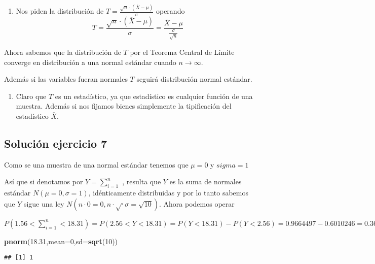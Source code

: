 \documentclass[]{article}
\newenvironment{Shaded}{\begin{snugshade}}{\end{snugshade}}
\newcommand{\DataTypeTok}[1]{\textcolor[rgb]{0.13,0.29,0.53}{#1}}
\newcommand{\DecValTok}[1]{\textcolor[rgb]{0.00,0.00,0.81}{#1}}
\newcommand{\FloatTok}[1]{\textcolor[rgb]{0.00,0.00,0.81}{#1}}
\newcommand{\KeywordTok}[1]{\textcolor[rgb]{0.13,0.29,0.53}{\textbf{#1}}}
\newcommand{\NormalTok}[1]{#1}
\providecommand{\tightlist}{%
  \setlength{\itemsep}{0pt}\setlength{\parskip}{0pt}}
\begin{document}
\begin{enumerate}
\def\labelenumi{\alph{enumi}.}
\tightlist
\item
  Nos piden la distribución de
  \(T=\frac{\sqrt{n}\cdot (\overline{X}-\mu)}{\sigma}\) operando
  \[T=\frac{\sqrt{n}\cdot(\overline{X}-\mu)}{\sigma}=
  \frac{\overline{X}-\mu}{\frac{\sigma}{\sqrt{n}}}\]
\end{enumerate}

Ahora sabemos que la distribución de \(T\) por el Teorema Central de
Límite converge en distribución a una normal estándar cuando
\(n\to\infty\).

Además si las variables fueran normales \(T\) seguirá distribución
normal estándar.

\begin{enumerate}
\def\labelenumi{\alph{enumi}.}
\setcounter{enumi}{1}
\tightlist
\item
  Claro que \(T\) es un estadístico, ya que estadístico es cualquier
  función de una muestra. Además si nos fijamos bienes simplemente la
  tipificación del estadístico \(\overline{X}\).
\end{enumerate}

\hypertarget{soluciuxf3n-ejercicio-7}{%
\subsection{Solución ejercicio 7}\label{soluciuxf3n-ejercicio-7}}

Como se una muestra de una normal estándar tenemos que \(\mu=0\) y
\(sigma=1\)

Así que si denotamos por \(Y=\sum_{i=1}^{n}\) , resulta que \(Y\) es la
suma de normales estándar \(N(\mu=0,\sigma=1)\), idénticamente
distribuidas y por lo tanto sabemos que \(Y\) sigue una ley
\(N(n\cdot 0=0, n\cdot \sqrt\cdot \sigma=\sqrt{10})\). Ahora podemos
operar

\(P\left(1.56< \sum_{i=1}^{n}< 18.31\right)=P(2.56< Y < 18.31)=P(Y< 18.31)-P(Y< 2.56)=0.9664497- 0.6010246= 0.3654251.\)

\begin{Shaded}
\begin{Highlighting}[]
\KeywordTok{pnorm}\NormalTok{(}\FloatTok{18.31}\NormalTok{,}\DataTypeTok{mean=}\DecValTok{0}\NormalTok{,}\DataTypeTok{sd=}\KeywordTok{sqrt}\NormalTok{(}\DecValTok{10}\NormalTok{))}
\end{Highlighting}
\end{Shaded}

\begin{verbatim}
## [1] 1
\end{verbatim}
\end{document}
